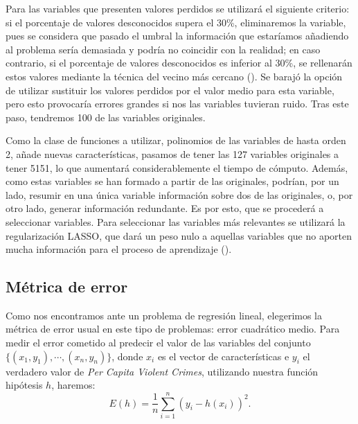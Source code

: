 \documentclass[a4paper, 20pt]{article}
\begin{document}
Para las variables que presenten valores perdidos se utilizará el siguiente criterio: si el porcentaje de valores desconocidos supera el 30\%, eliminaremos la variable, pues se considera que pasado el umbral la información que estaríamos añadiendo al problema sería demasiada y podría no coincidir con la realidad; en caso contrario, si el porcentaje de valores desconocidos es inferior al 30\%, se rellenarán estos valores mediante la técnica del vecino más cercano (\cite{}). Se barajó la opción de utilizar sustituir los valores perdidos por el valor medio para esta variable, pero esto provocaría errores grandes si nos las variables tuvieran ruido. Tras este paso, tendremos 100 de las variables originales.

Como la clase de funciones a utilizar, polinomios de las variables de hasta orden 2, añade nuevas características, pasamos de tener las 127 variables originales a tener 5151, lo que aumentará considerablemente el tiempo de cómputo. Además, como estas variables se han formado a partir de las originales, podrían, por un lado, resumir en una única variable información sobre dos de las originales, o, por otro lado, generar información redundante. Es por esto, que se procederá a seleccionar variables. Para seleccionar las variables más relevantes se utilizará la regularización LASSO, que dará un peso nulo a aquellas variables que no aporten mucha información para el proceso de aprendizaje (\cite{}). 

\subsection{Métrica de error}
Como nos encontramos ante un problema de regresión lineal, elegerimos la métrica de error usual en este tipo de problemas: error cuadrático medio. Para medir el error cometido al predecir el valor de las variables del conjunto $\{(x_1,y_1),\cdots,(x_n,y_n)\}$, donde $x_i$ es el vector de características e $y_i$ el verdadero valor de \textit{Per Capita Violent Crimes}, utilizando nuestra función hipótesis $h$, haremos:\[
E(h) = \frac{1}{n}\sum_{i=1}^n\left(y_i-h(x_i)\right)^2.
\]
\end{document}
